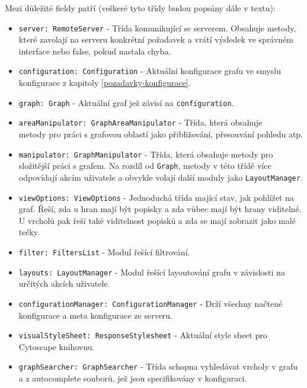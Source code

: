 Mezi důležité fieldy patří (veškeré tyto třídy budou popsány dále v textu):
\begin{itemize}
  \item \texttt{server: RemoteServer} - Třída komunikující se serverem. Obsahuje metody, které zavolají na serveru konkrétní požadavek a vrátí výsledek ve správném interface nebo false, pokud nastala chyba.
  \item \texttt{configuration: Configuration} - Aktuální konfigurace grafu ve smyslu konfigurace z kapitoly \ref{pozadavky-konfigurace}.
  \item \texttt{graph: Graph} - Aktuální graf jež závisí na \texttt{configuration}.
  \item \texttt{areaManipulator: GraphAreaManipulator} - Třída, která obsahuje \\ metody pro práci s grafovou oblastí jako přibližování, přesouvání pohledu atp.
  \item \texttt{manipulator: GraphManipulator} - Třída, která obsahuje metody pro složitější práci s grafem. Na rozdíl od \texttt{Graph}, metody v této třídě více odpovídají akcím uživatele a obvykle volají další moduly jako \texttt{LayoutManager}.
  \item \texttt{viewOptions: ViewOptions} - Jednoduchá třída mající stav, jak pohlížet na graf. Řeší, zda u hran mají být popisky a zda vůbec mají být hrany viditelné. U vrcholů pak řeší také viditelnost popisků a zda se mají zobrazit jako malé tečky.
  \item \texttt{filter: FiltersList} - Modul řešící filtrování.
  \item \texttt{layouts: LayoutManager} - Modul řešící layoutování grafu v závislosti na určitých akcích uživatele.
  \item \texttt{configurationManager: ConfigurationManager} - Drží všechny načtené konfigurace a meta konfigurace ze serveru.
  \item \texttt{visualStyleSheet: ResponseStylesheet} - Aktuální style sheet pro \\ Cytoscape knihovnu.
  \item \texttt{graphSearcher: GraphSearcher} - Třída schopna vyhledávat vrcholy v grafu a z autocomplete souborů, jež jsou specifikovány v konfiguraci.
\end{itemize}

